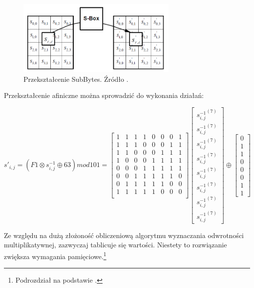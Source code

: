 \begin{figure}[H]
    \centering
    \includegraphics[width=0.7\textwidth]{rysunki/AES_opis/subbytes.PNG}
    \caption{Przekształcenie SubBytes. Źródło \cite{fips_197}.}
    \label{fig:subbytes}
\end{figure}
Przekształcenie afiniczne można sprowadzić do wykonania działań:
\begin{center}
$ s'_{i,j}=(F1\otimes s^{-1}_{i,j}\oplus 63) mod 101=
\begin{bmatrix} 
  1 & 1 & 1 & 1 & 0 & 0 & 0 & 1 \\
  1 & 1 & 1 & 0 & 0 & 0 & 1 & 1 \\
  1 & 1 & 0 & 0 & 0 & 1 & 1 & 1 \\
  1 & 0 & 0 & 0 & 1 & 1 & 1 & 1 \\
  0 & 0 & 0 & 1 & 1 & 1 & 1 & 1 \\
  0 & 0 & 1 & 1 & 1 & 1 & 1 & 0 \\        
  0 & 1 & 1 & 1 & 1 & 1 & 0 & 0 \\
  1 & 1 & 1 & 1 & 1 & 0 & 0 & 0 \\
\end{bmatrix}
\begin{bmatrix} 
  {s^{-1}_{i,j}}^{(7)} \\
  {s^{-1}_{i,j}}^{(7)} \\
  {s^{-1}_{i,j}}^{(7)} \\
  {s^{-1}_{i,j}}^{(7)} \\
  {s^{-1}_{i,j}}^{(7)} \\
  {s^{-1}_{i,j}}^{(7)} \\
  {s^{-1}_{i,j}}^{(7)} \\
  {s^{-1}_{i,j}}^{(7)}
\end{bmatrix}
\oplus
\begin{bmatrix} 
  0  \\
  1  \\
  1  \\
  0  \\
  0  \\
  0  \\        
  1  \\
  1  
\end{bmatrix}
$
\end{center}
Ze względu na dużą złożoność obliczeniową algorytmu wyznaczania odwrotności multiplikatywnej, zazwyczaj tablicuje się wartości. Niestety to rozwiązanie zwiększa wymagania pamięciowe.\footnote{Podrozdział na podstawie \cite{fips_197}.}
\newpage
